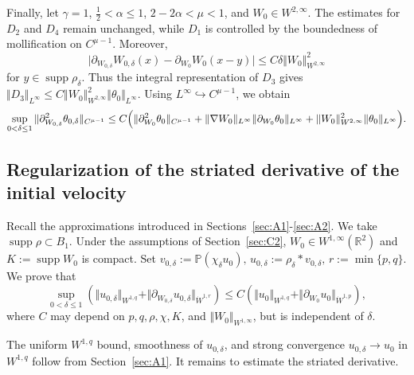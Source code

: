 \documentclass[reqno,11pt,a4paper]{amsart}
\begin{document}
Finally, let $\gamma=1$, $\frac12<\alpha\leq1$,
$2-2\alpha<\mu<1$, and $W_0\in W^{2,\infty}$.
The estimates for $D_2$ and $D_4$ remain unchanged,
while $D_1$ is controlled by the boundedness
of mollification on $C^{\mu-1}$.
Moreover,
\[
  \bigl|
    \partial_{W_{0,\delta}}W_{0,\delta}(x)
    -\partial_{W_0}W_0(x-y)
  \bigr|
  \leq C\delta\Vert W_0\Vert _{W^{2,\infty}}^2
\]
for $y\in\operatorname{supp}\rho_\delta$.
Thus the integral representation of $D_3$ gives $\Vert D_3\Vert _{L^\infty}
  \leq C\Vert W_0\Vert _{W^{2,\infty}}^2
  \Vert \theta_0\Vert _{L^\infty}$. 
Using $L^\infty\hookrightarrow C^{\mu-1}$,
we obtain
\begin{align*}
  \sup_{0<\delta\leq1}
  \Vert \partial_{W_{0,\delta}}^2\theta_{0,\delta}
    \Vert _{C^{\mu-1}}
  \leq
  C\Bigl(
    \Vert \partial_{W_0}^2\theta_0\Vert _{C^{\mu-1}}
    +
    \Vert \nabla W_0\Vert _{L^\infty}
    \Vert \partial_{W_0}\theta_0\Vert _{L^\infty}
    +
    \Vert W_0\Vert _{W^{2,\infty}}^2
    \Vert \theta_0\Vert _{L^\infty}
  \Bigr).
\end{align*}

\subsection{Regularization of the striated derivative
of the initial velocity}
\label{sec:A3}

Recall the approximations introduced in
Sections~\ref{sec:A1}-\ref{sec:A2}.
We take $\operatorname{supp}\rho\subset B_1$.
Under the assumptions of Section~\ref{sec:C2},
$W_0\in W^{1,\infty}(\mathbb R^2)$
and $K:=\operatorname{supp}W_0$ is compact.
Set $v_{0,\delta}:=\mathbb P(\chi_\delta u_0),\,u_{0,\delta}:=\rho_\delta*v_{0,\delta},\, r:=\min\{p,q\}$.
We prove that
\begin{equation}\label{eq:velocity-regularization-uniform}
  \sup_{0<\delta\leq1}
  \left(
    \Vert u_{0,\delta}\Vert _{W^{1,q}}
    +
    \Vert \partial_{W_{0,\delta}}u_{0,\delta}
      \Vert _{\dot W^{1,r}}
  \right)
  \leq
  C\left(
    \Vert u_0\Vert _{W^{1,q}}
    +
    \Vert \partial_{W_0}u_0\Vert _{\dot W^{1,p}}
  \right),
\end{equation}
where $C$ may depend on $p,q,\rho,\chi,K$,
and $\Vert W_0\Vert _{W^{1,\infty}}$,
but is independent of $\delta$.

The uniform $W^{1,q}$ bound, smoothness of $u_{0,\delta}$,
and strong convergence $u_{0,\delta}\to u_0$ in $W^{1,q}$
follow from Section~\ref{sec:A1}.
It remains to estimate the striated derivative.
\end{document}
